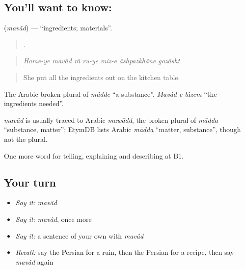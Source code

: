 \subsection*{You'll want to know: }
\textbf{} (\emph{mavâd}) — \textquotedblleft{}ingredients; materials\textquotedblright{}.

\begin{quote}
      .
\end{quote}

\begin{quote}
\emph{Hame-ye mavâd râ ru-ye miz-e âshpazkhâne gozâsht.}
\end{quote}

\begin{quote}
She put all the ingredients out on the kitchen table.
\end{quote}

The Arabic broken plural of \emph{mâdde} \textquotedblleft{}a substance\textquotedblright{}. \emph{Mavâd-e lâzem} \textquotedblleft{}the ingredients needed\textquotedblright{}.

\begin{cousinweb}
\emph{mavâd} is usually traced to Arabic \emph{mawādd}, the broken plural of \emph{mādda} \textquotedblleft{}substance, matter\textquotedblright{}; EtymDB lists Arabic \emph{mādda} \textquotedblleft{}matter, substance\textquotedblright{}, though not the plural.
\end{cousinweb}

\begin{grammarlens}[title={What you've built}]
One more word for telling, explaining and describing at B1.
\end{grammarlens}

\subsection*{Your turn}
\begin{itemize}
\raggedright
  \item \emph{Say it:} \emph{mavâd}
  \item \emph{Say it:} \emph{mavâd}, once more
  \item \emph{Say it:} a sentence of your own with \emph{mavâd}
  \item \emph{Recall:} say the Persian for a ruin, then the Persian for a recipe, then say \emph{mavâd} again
\end{itemize}

